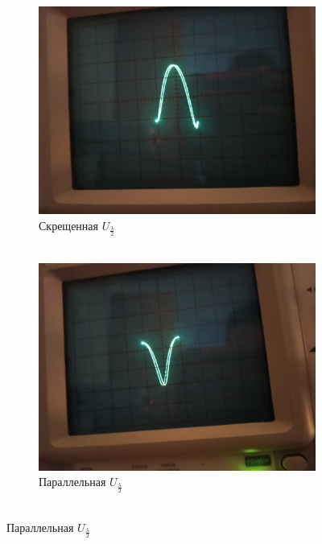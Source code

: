 \documentclass[a4paper, 12pt]{article}
\begin{document}
\begin{figure}[!h]

\begin{subfigure}{0.5\textwidth}
    \includegraphics[scale = 0.15]{intersect1}
    \centering
    \caption{Скрещенная $U_\frac{\lambda}{2}$\\~}
\end{subfigure}
\begin{subfigure}{0.5\textwidth}
    \includegraphics[scale = 0.15]{parallel1}
    \centering
    \caption{Параллельная $U_\frac{\lambda}{2}$\\~}
\end{subfigure}


\end{figure}
\end{document}
